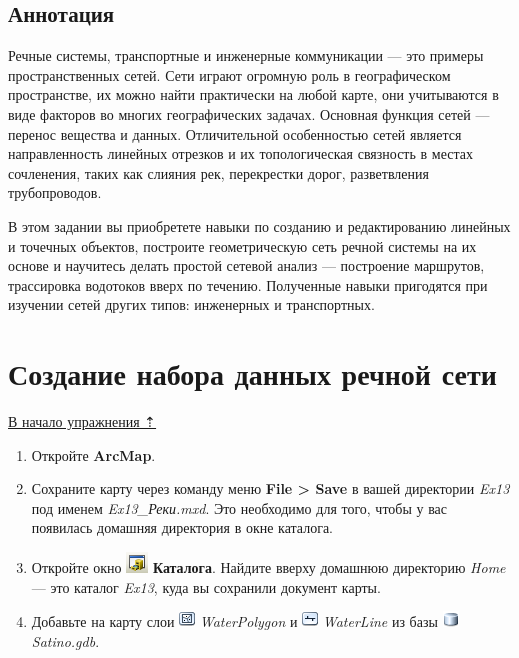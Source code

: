 \documentclass[]{book}
\theoremstyle{definition}
\theoremstyle{definition}
\theoremstyle{definition}
\theoremstyle{remark}
\begin{document}
\hypertarget{network-hydro-annotation}{%
\subsection{Аннотация}\label{network-hydro-annotation}}

Речные системы, транспортные и инженерные коммуникации --- это примеры
пространственных сетей. Сети играют огромную роль в географическом
пространстве, их можно найти практически на любой карте, они учитываются
в виде факторов во многих географических задачах. Основная функция сетей
--- перенос вещества и данных. Отличительной особенностью сетей является
направленность линейных отрезков и их топологическая связность в местах
сочленения, таких как слияния рек, перекрестки дорог, разветвления
трубопроводов.

В этом задании вы приобретете навыки по созданию и редактированию
линейных и точечных объектов, построите геометрическую сеть речной
системы на их основе и научитесь делать простой сетевой анализ ---
построение маршрутов, трассировка водотоков вверх по течению. Полученные
навыки пригодятся при изучении сетей других типов: инженерных и
транспортных.

\hypertarget{network-hydro-dataset}{%
\section{Создание набора данных речной
сети}\label{network-hydro-dataset}}

\protect\hyperlink{network-hydro}{В начало упражнения ⇡}

\begin{enumerate}
\def\labelenumi{\arabic{enumi}.}
\item
  Откройте \textbf{ArcMap}.
\item
  Сохраните карту через команду меню \textbf{File \textgreater{} Save} в
  вашей директории \emph{Ex13} под именем \emph{Ex13\_Реки.mxd}. Это
  необходимо для того, чтобы у вас появилась домашняя директория в окне
  каталога.
\item
  Откройте окно \includegraphics{images/Ex13/image2.png}
  \textbf{Каталога}. Найдите вверху домашнюю директорию \emph{Home} ---
  это каталог \emph{Ex13}, куда вы сохранили документ карты.
\item
  Добавьте на карту слои \includegraphics{images/Ex13/image3.png}
  \emph{WaterPolygon} и \includegraphics{images/Ex13/image4.png}
  \emph{WaterLine} из базы \includegraphics{images/Ex13/image5.png}
  \emph{Satino.gdb}.
\end{enumerate}
\end{document}
